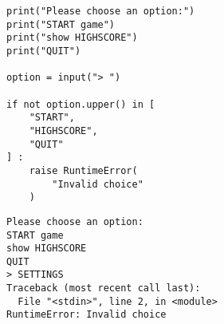 \begin{frame}[fragile]
%
\begin{tcbraster}[raster columns=2,
                  raster equal height,
                  nobeforeafter,
                  raster column skip=0.5cm]
\begin{codebox}
\begin{verbatim}
print("Please choose an option:")
print("START game")
print("show HIGHSCORE")
print("QUIT")

option = input("> ")

if not option.upper() in [
    "START",
    "HIGHSCORE",
    "QUIT"
] :
    raise RuntimeError(
        "Invalid choice"
    )
\end{verbatim}
\end{codebox}
%
\begin{cmdbox}
\begin{verbatim}
Please choose an option:
START game
show HIGHSCORE
QUIT
> SETTINGS
Traceback (most recent call last):
  File "<stdin>", line 2, in <module>
RuntimeError: Invalid choice
\end{verbatim}
\end{cmdbox}
\end{tcbraster}
%
\end{frame}


